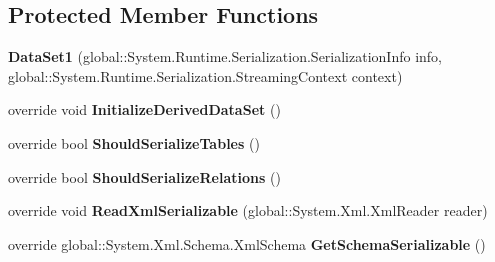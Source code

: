 \subsection*{Protected Member Functions}
\begin{CompactItemize}
\item 
\textbf{DataSet1} (global::System.Runtime.Serialization.SerializationInfo info, global::System.Runtime.Serialization.StreamingContext context)\label{class_automatic_medical_system_1_1_data_set1_34f433fac3acfc91916950d63170518f}

\item 
override void \textbf{InitializeDerivedDataSet} ()\label{class_automatic_medical_system_1_1_data_set1_773009c386ff9c63e141c752f42d0986}

\item 
override bool \textbf{ShouldSerializeTables} ()\label{class_automatic_medical_system_1_1_data_set1_c7f3261d79dc7ab05b7fd67737350305}

\item 
override bool \textbf{ShouldSerializeRelations} ()\label{class_automatic_medical_system_1_1_data_set1_bbadab95c998e400e9c17d4e0bbcce7b}

\item 
override void \textbf{ReadXmlSerializable} (global::System.Xml.XmlReader reader)\label{class_automatic_medical_system_1_1_data_set1_fc86c6fe1ae339052840eb743c2f04d3}

\item 
override global::System.Xml.Schema.XmlSchema \textbf{GetSchemaSerializable} ()\label{class_automatic_medical_system_1_1_data_set1_3356d3bf34c81b5454ded853b951a708}

\end{CompactItemize}
